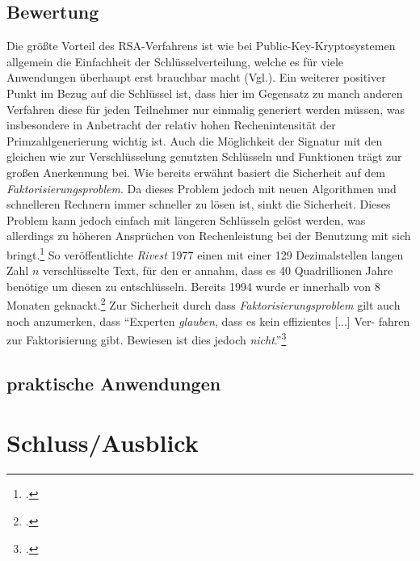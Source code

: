 \documentclass{scrarticle} %
\begin{document}
    \subsection{Bewertung}
        Die größte Vorteil des RSA-Verfahrens ist wie bei Public-Key-Kryptosystemen allgemein die Einfachheit der Schlüsselverteilung, welche es für viele Anwendungen überhaupt erst brauchbar macht (Vgl.\cite[285]{dankmeier2006}). Ein weiterer positiver Punkt im Bezug auf die Schlüssel ist, dass hier im Gegensatz zu manch anderen Verfahren diese für jeden Teilnehmer nur einmalig generiert werden müssen, was insbesondere in Anbetracht der relativ hohen Rechenintensität der Primzahlgenerierung wichtig ist. Auch die Möglichkeit der Signatur mit den gleichen wie zur Verschlüsselung genutzten Schlüsseln und Funktionen trägt zur großen Anerkennung bei. Wie bereits erwähnt basiert die Sicherheit auf dem \emph{Faktorisierungsproblem}. Da dieses Problem jedoch mit neuen Algorithmen und schnelleren Rechnern immer schneller zu lösen ist, sinkt die Sicherheit. Dieses Problem kann jedoch einfach mit längeren Schlüsseln gelöst werden, was allerdings zu höheren Ansprüchen von Rechenleistung bei der Benutzung mit sich bringt.\footcite[Vgl.][]{zum2020} So veröffentlichte \emph{Rivest} 1977 einen mit einer 129 Dezimalstellen langen Zahl $n$ verschlüsselte Text, für den er annahm, dass es 40 Quadrillionen Jahre benötige um diesen zu entschlüsseln. Bereits 1994 wurde er innerhalb von 8 Monaten geknackt.\footcite[Vgl.][73]{watjen2008} Zur Sicherheit durch dass \emph{Faktorisierungsproblem} gilt auch noch anzumerken, dass \enquote{Experten \emph{glauben}, dass es kein effizientes [...] Ver-
        fahren zur Faktorisierung gibt. Bewiesen ist dies jedoch \emph{nicht}.}\footcite[80]{ertel2003}

    \subsection{praktische Anwendungen}
        
    \section{Schluss/Ausblick}

    \newpage
    \printbibliography
    \newpage
    
\end{document}
